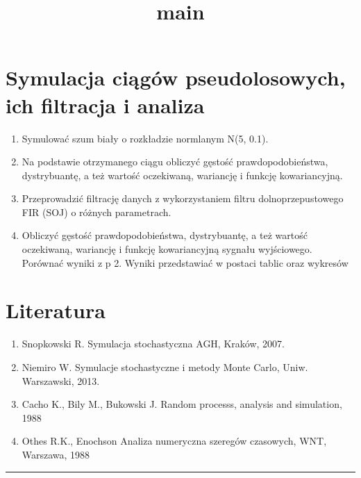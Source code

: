 \documentclass[11pt]{article}
\title{main}
\providecommand{\tightlist}{%
      \setlength{\itemsep}{0pt}\setlength{\parskip}{0pt}}
\begin{document}
    
    \maketitle
    
    

    
    \hypertarget{symulacja-ciux105guxf3w-pseudolosowych-ich-filtracja-i-analiza}{%
\section{Symulacja ciągów pseudolosowych, ich filtracja i
analiza}\label{symulacja-ciux105guxf3w-pseudolosowych-ich-filtracja-i-analiza}}

\begin{enumerate}
\def\labelenumi{\arabic{enumi}.}
\tightlist
\item
  Symulować szum biały o rozkładzie normlanym N(5, 0.1).
\item
  Na podstawie otrzymanego ciągu obliczyć gęstość prawdopodobieństwa,
  dystrybuantę, a też wartość oczekiwaną, wariancję i funkcję
  kowariancyjną.
\item
  Przeprowadzić filtrację danych z wykorzystaniem filtru
  dolnoprzepustowego FIR (SOJ) o różnych parametrach.
\item
  Obliczyć gęstość prawdopodobieństwa, dystrybuantę, a też wartość
  oczekiwaną, wariancję i funkcję kowariancyjną sygnału wyjściowego.
  Porównać wyniki z p 2. Wyniki przedstawiać w postaci tablic oraz
  wykresów
\end{enumerate}

    \hypertarget{literatura}{%
\section{Literatura}\label{literatura}}

\begin{enumerate}
\def\labelenumi{\arabic{enumi}.}
\tightlist
\item
  Snopkowski R. Symulacja stochastyczna AGH, Kraków, 2007.
\item
  Niemiro W. Symulacje stochastyczne i metody Monte Carlo, Uniw.
  Warszawski, 2013.
\item
  Cacho K., Bily M., Bukowski J. Random processs, analysis and
  simulation, 1988
\item
  Othes R.K., Enochson Analiza numeryczna szeregów czasowych, WNT,
  Warszawa, 1988
\end{enumerate}

    \begin{center}\rule{0.5\linewidth}{0.5pt}\end{center}
\end{document}
